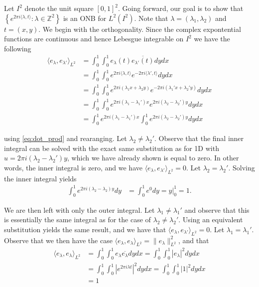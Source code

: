 \documentclass[../thesis.tex]{subfiles}
\begin{document}
Let $I^2$ denote the unit square $[0,1]^2$. Going forward, our goal is to show that $\left\{ e^{2\pi i \langle \lambda,t  \rangle } : \lambda \in \mathbb{Z}^2\right\}$ is an ONB for $L^2{(I^2)}$. Note that $\lambda=(\lambda_1,\lambda_2)$ and $t=(x,y)$. We begin with the orthogonality. Since the complex expontential functions are continuous and hence Lebesgue integrable on $I^2$ we have the following
\begin{align*} 
    \langle e_\lambda,e_{\lambda'} \rangle_{L^2} &= \int_0^1\int_0^1 e_{\lambda}(t) \overline{e_{\lambda'}(t)} dy dx\\ 
    &= \int_0^1\int_0^1 e^{2\pi i \langle \lambda,t\rangle } e^{-2\pi i  \langle \lambda',t\rangle} dy dx\\ 
    &= \int_0^1\int_0^1 e^{2\pi i  (\lambda_1x + \lambda_2 y)} e^{-2\pi i  (\lambda_1' x + \lambda_2' y)} dy dx\\ 
    &= \int_0^1\int_0^1 e^{2\pi i  (\lambda_1- \lambda_1')x} e^{2\pi i  (\lambda_2 - \lambda_2')y} dy dx\\ 
    &= \int_0^1e^{2\pi i  (\lambda_1- \lambda_1')x}\int_0^1  e^{2\pi i  (\lambda_2 - \lambda_2')y} dy dx
\end{align*}

using \cref{eq:dot_prod} and rearanging. Let $\lambda_2 \neq \lambda_2'$. Observe that the final inner integral can be solved with the exact same substitution as for 1D with $u = 2 \pi i (\lambda_2 - \lambda_2')y$, which we have already shown is equal to zero. In other words, the inner integral is zero, and we have $\langle e_\lambda,e_{\lambda'} \rangle_{L^2} = 0$. Let $\lambda_2 = \lambda_2'$. Solving the inner integral yields
\begin{align*}
    \int_0^1  e^{2\pi i  (\lambda_2 - \lambda_2)y} dy&= \int_0^1 e^0 dy = y \big| _0^1 = 1.
\end{align*}

We are then left with only the outer integral. Let $\lambda_1 \neq \lambda_1'$ and observe that this is essentially the same integral as for the case of $\lambda_2 \neq \lambda_2'$. Using an equivalent substitution yields the same result, and we have that $\langle e_\lambda,e_{\lambda'} \rangle_{L^2} = 0$. Let $\lambda_1 = \lambda_1'$. Observe that we then have the case $\langle e_\lambda,e_{\lambda} \rangle_{L^2} = \| e_\lambda \|^2_{L^2}$, and that 
\begin{align*}
    \langle e_\lambda, e_\lambda\rangle_{L^2} &= \int_0^1 \int_0^1 e_\lambda \overline{e_\lambda} dydx = \int_0^1 \int_0^1 |e_\lambda|^2 dydx \\
    &=\int_0^1\int_0^1 |e^{2 \pi i \lambda t}|^2dydx = \int_0^1\int_0^1 |1|^2 dydx  \\
    &= 1
\end{align*}
\end{document}
